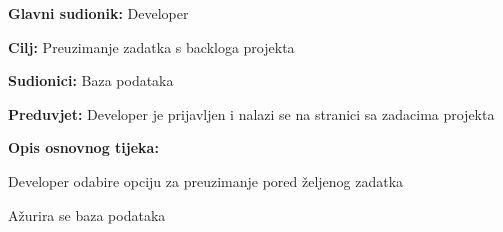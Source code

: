                         	\begin{packed_item}
                        		
                        		\item \textbf{Glavni sudionik: }Developer
                        		\item  \textbf{Cilj:} Preuzimanje zadatka s backloga projekta
                        		\item  \textbf{Sudionici:} Baza podataka
                        		\item  \textbf{Preduvjet:} Developer je prijavljen i nalazi se na stranici sa zadacima projekta
                        		\item  \textbf{Opis osnovnog tijeka:}
                        		
                        		\item[] \begin{packed_enum}
                        			
                        			\item Developer odabire opciju za preuzimanje pored željenog zadatka
                        			\item Ažurira se baza podataka
                        			
                        		\end{packed_enum}
                        		
                        		
                        	\end{packed_item}
                        	\noindent {}
